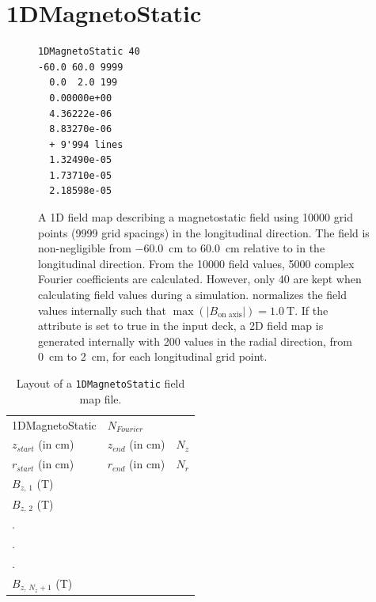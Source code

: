 \section{1DMagnetoStatic}
\label{sec:1DMagnetoStatic}
\begin{figure}[h]
  \begin{fmpage}
\begin{verbatim}
1DMagnetoStatic 40
-60.0 60.0 9999
  0.0  2.0 199
  0.00000e+00
  4.36222e-06
  8.83270e-06
  + 9'994 lines
  1.32490e-05
  1.73710e-05
  2.18598e-05
\end{verbatim}
  \end{fmpage}
  \caption[Example of a 1DMagnetoStatic field map]{A 1D field map describing a magnetostatic field using 10000 grid points
    (9999 grid spacings) in the longitudinal direction. The field is non-negligible from \SI{-60.0}{\centi\meter} to \SI{+60.0}{\centi\meter}
    relative to  in the longitudinal direction. From the 10000 field values, 5000 complex Fourier coefficients are
    calculated. However, only 40 are kept when calculating field values during a simulation. \opalt normalizes the field values
    internally such that $\max(|B_{\text{on axis}}|) = \SI{1.0}{\tesla}$. If the  attribute is set to true in the input
    deck, a 2D field map is generated internally with 200 values in the radial direction, from \SI{0}{\centi\meter} to \SI{2}{\centi\meter}, for each
    longitudinal grid point.}
  \label{fig:1DMagnetoStatic}
\end{figure}
\begin{table}[h!]
    \caption{Layout of a \texttt{1DMagnetoStatic} field map file.}
    \label{tab:1DMagnetoStatic}
    \begin{center}
    \begin{tabular}{lll}
      \hline
      1DMagnetoStatic & $N_{Fourier}$ & \\
      $z_{start}$ (in cm) & $z_{end}$ (in cm) & $N_{z}$ \\
      $r_{start}$ (in cm) & $r_{end}$ (in cm) & $N_{r}$ \\
      $B_{z,\,1}$ (T) & & \\
      $B_{z,\,2}$ (T) & & \\
      . & & \\
      . & & \\
      . & & \\
      $B_{z,\,N_{z} + 1}$ (T) & & \\
      \hline
    \end{tabular}
    \end{center}
\end{table}

